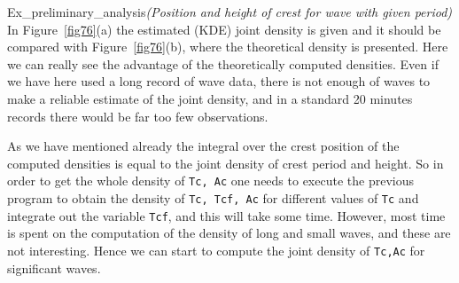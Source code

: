 \begin{cex}{Ex_preliminary_analysis}{\sl (Position and height of  
crest for wave with given period)}
In Figure~\ref{fig76}(a) the estimated (KDE) joint density is given
and it should be compared with Figure~\ref{fig76}(b), where the
theoretical density is presented. Here we can really see the advantage
of the theoretically computed densities. Even if we have here used a
long record of wave data, there is not enough of waves to make a
reliable estimate of the joint density, and in a standard 20 minutes
records there would be far too few observations.
\end{cex}

As we have mentioned already the  integral over the crest position of the
computed densities is equal to the joint density of crest period and
height. So in order to get the whole density of {\tt Tc, Ac} one
needs to execute the previous program to obtain the density of
{\tt Tc, Tcf, Ac}  for different values of {\tt Tc} and integrate out
the variable  {\tt Tcf}, and this will take some time.  However, 
most time is spent on the computation of the density of long and small
waves, and these are not interesting. Hence we can start to compute the
joint density of {\tt Tc,Ac} for significant waves.

